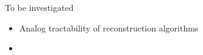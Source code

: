 \documentclass{beamer}
\begin{document}
\begin{frame}{To be investigated}
  \begin{itemize}
    \item{Analog tractability of reconstruction algorithms}
    \item{}
  \end{itemize}
\end{frame}

%
%
%  
%  
\end{document}

